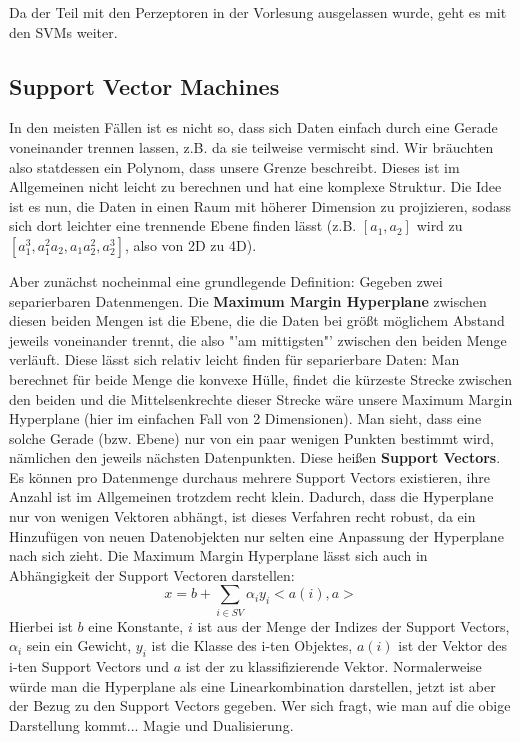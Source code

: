 Da der Teil mit den Perzeptoren in der Vorlesung ausgelassen wurde, geht 
es mit den SVMs weiter.

\subsection{Support Vector Machines}
In den meisten Fällen ist es nicht so, dass sich Daten einfach durch
eine Gerade voneinander trennen lassen, z.B. da sie teilweise vermischt 
sind. Wir bräuchten also statdessen ein Polynom, dass unsere Grenze 
beschreibt. Dieses ist im Allgemeinen nicht leicht zu berechnen und hat
eine komplexe Struktur. Die Idee ist es nun, die Daten in einen Raum
mit höherer Dimension zu projizieren, sodass sich dort leichter
eine trennende Ebene finden lässt (z.B. \([a_1,a_2]\) wird zu
\([a_1^3,a_1^2 a_2, a_1 a_2^2, a_2^3]\), also von 2D zu 4D).

Aber zunächst nocheinmal eine grundlegende Definition:
Gegeben zwei separierbaren Datenmengen. Die \textbf{Maximum
Margin Hyperplane} zwischen diesen beiden Mengen ist die Ebene, die
die Daten bei größt möglichem Abstand jeweils voneinander trennt, die 
also "'am mittigsten"' zwischen den beiden Menge verläuft. Diese lässt
sich relativ leicht finden für separierbare Daten: Man berechnet für beide
Menge die konvexe Hülle, findet die kürzeste Strecke zwischen den
beiden und die Mittelsenkrechte dieser Strecke wäre unsere Maximum
Margin Hyperplane (hier im einfachen Fall von 2 Dimensionen). Man sieht,
dass eine solche Gerade (bzw. Ebene) nur von ein paar wenigen Punkten
bestimmt wird, nämlichen den jeweils nächsten Datenpunkten.
Diese heißen \textbf{Support Vectors}. Es können pro Datenmenge
durchaus mehrere Support Vectors existieren, ihre Anzahl ist im 
Allgemeinen trotzdem recht klein. Dadurch, dass die Hyperplane nur von
wenigen Vektoren abhängt, ist dieses Verfahren recht robust, da 
ein Hinzufügen von neuen Datenobjekten nur selten eine Anpassung
der Hyperplane nach sich zieht. Die Maximum Margin Hyperplane lässt
sich auch in Abhängigkeit der Support Vectoren darstellen:
\[x = b + \sum _{i \in SV} \alpha_i y_i <a(i),a>\]
Hierbei ist \(b\) eine Konstante, \(i\) ist aus der Menge der Indizes 
der Support Vectors, \(\alpha_i\) sein ein Gewicht, \(y_i\) ist die 
Klasse des i-ten Objektes, \(a(i)\) ist der Vektor des i-ten Support 
Vectors und \(a\) ist der zu klassifizierende Vektor. Normalerweise
würde man die Hyperplane als eine Linearkombination darstellen, jetzt
ist aber der Bezug zu den Support Vectors gegeben. Wer sich fragt,
wie man auf die obige Darstellung kommt... Magie und Dualisierung.

